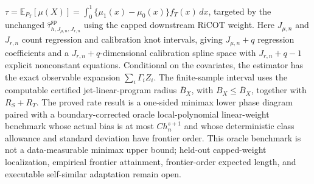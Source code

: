 \(\tau=\mathbb E_{P_T}[\mu(X)]=\int_0^1\{\mu_1(x)-\mu_0(x)\}f_T(x)\,dx\), targeted by the unchanged \(\widehat\tau^{\mathrm{sp}}_{h,J_{\mu,n},J_{r,n}}\) using the capped downstream RiCOT weight. Here \(J_{\mu,n}\) and \(J_{r,n}\) count regression and calibration knot intervals, giving \(J_{\mu,n}+q\) regression coefficients and a \(J_{r,n}+q\)-dimensional calibration spline space with \(J_{r,n}+q-1\) explicit nonconstant equations. Conditional on the covariates, the estimator has the exact observable expansion \(\sum_i\Gamma_i Z_i\). The finite-sample interval uses the computable certified jet-linear-program radius \(\overline B_X\), with \(B_X\le\overline B_X\), together with \(R_S+R_T\). The proved rate result is a one-sided minimax lower phase diagram paired with a boundary-corrected oracle local-polynomial linear-weight benchmark whose actual bias is at most \(Ch_n^{s+1}\) and whose deterministic class allowance and standard deviation have frontier order. This oracle benchmark is not a data-measurable minimax upper bound; held-out capped-weight localization, empirical frontier attainment, frontier-order expected length, and executable self-similar adaptation remain open.